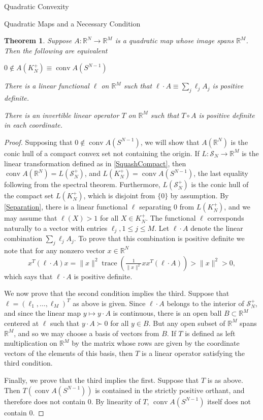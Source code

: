 \documentclass[12pt,oneside,final]{ucthesisucsbmath2010}
\newcommand{\R}{\mathbb{R}}
\newcommand{\s}{\mathcal{S}}
\DeclareMathOperator{\trace}{trace}
\DeclareMathOperator{\conv}{conv}
\newcounter{qcounter}
\newtheorem{thm}{Theorem}[section]
\theoremstyle{definition}
\begin{document}
\begin{chapter}{Quadratic Convexity}
\begin{section}{Quadratic Maps and a Necessary Condition}
\begin{thm}Suppose $A : \R^N \to \R^M$ is a quadratic map whose image spans $\R^M$. Then the following are equivalent
\begin{list}{)}{}
\item $0 \notin A(K_N^+) \equiv \conv A(S^{N-1})$
\item There is a linear functional $\ell$ on $\R^M$ such that $\ell \cdot A \equiv \sum_j \ell_j A_j$ is positive definite.
\item There is an invertible linear operator $T$ on $\R^M$ such that $T\circ A$ is positive definite in each coordinate.
\end{list}
\label{MakeCompact}
\end{thm}
\begin{proof}Supposing that $0\notin \conv A(S^{N-1})$, we will show that $A(\R^N)$ is the conic hull of a compact convex set not containing the origin. If $L:\s_N \to \R^M$ is the linear transformation defined as in \ref{SquashCompact}, then $\conv A(\R^N) = L(\s_N^+)$, and $L(K_N^+) = \conv A(S^{N-1})$, the last equality following from the spectral theorem. Furthermore, $L(\s_N^+)$ is the conic hull of the compact set $L(K_N^+)$, which is disjoint from $\{0\}$ by assumption. By \ref{Separation}, there is a linear functional $\ell$ separating $0$ from $L(K_N^+)$, and we may assume that $\ell(X)>1$ for all $X \in K_N^+$. The functional $\ell$ corresponds naturally to a vector with entries $\ell_j, 1\leq j \leq M$. Let $\ell \cdot A$ denote the linear combination $\sum_j \ell_j A_j$. To prove that this combination is positive definite we note that for any nonzero vector $x \in \R^N$ 
\[x^T(\ell \cdot A)x=\|x\|^2\trace (\tfrac{1}{\|x\|^2}xx^T(\ell \cdot A))>\|x\|^2>0,\]
which says that $\ell \cdot A$ is positive definite.

We now prove that the second condition implies the third. Suppose that $\ell = (\ell_1,\ldots, \ell_M)^T$ as above is given. Since $\ell \cdot A$ belongs to the interior of $\s_N^+$, and since the linear map $y \mapsto y \cdot A$ is continuous, there is an open ball $B\subset \R^M$ centered at $\ell$ such that $y \cdot A \succ 0$ for all $y \in B$. But any open subset of $\R^M$ spans $\R^M$, and so we may choose a basis of vectors from $B$. If $T$ is defined as left multiplication on $\R^M$ by the matrix whose rows are given by the coordinate vectors of the elements of this basis, then $T$ is a linear operator satisfying the third condition.

Finally, we prove that the third implies the first. Suppose that $T$ is as above. Then $T(\conv A(S^{N-1}))$ is contained in the strictly positive orthant, and therefore does not contain $0$. By linearity of $T$, $\conv A(S^{N-1})$ itself does not contain $0$.\end{proof}


\end{section}
\end{chapter}
\end{document}
